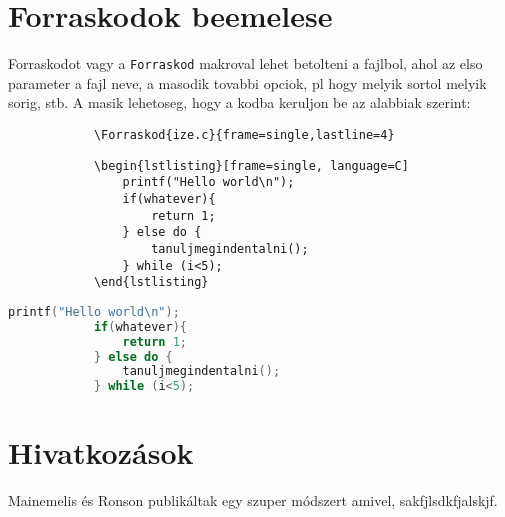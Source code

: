 \documentclass[12ppt,a4paper,oneside]{report}
\begin{document}
    \section{Forraskodok beemelese}
        Forraskodot vagy a \texttt{Forraskod} makroval lehet betolteni a fajlbol, ahol az elso parameter a fajl neve, a masodik tovabbi opciok, pl hogy melyik sortol melyik sorig, stb. A masik lehetoseg, hogy a kodba keruljon be az alabbiak szerint:

        \begin{verbatim}
            \Forraskod{ize.c}{frame=single,lastline=4}
        \end{verbatim}


        \begin{verbatim}
            \begin{lstlisting}[frame=single, language=C]
                printf("Hello world\n");
                if(whatever){
                    return 1;
                } else do {
                    tanuljmegindentalni();
                } while (i<5);
            \end{lstlisting}
        \end{verbatim}
        
        \begin{lstlisting}[frame=single, language=C]
            printf("Hello world\n");
            if(whatever){
                return 1;
            } else do {
                tanuljmegindentalni();
            } while (i<5);
        \end{lstlisting}

    \section{Hivatkozások}

    Mainemelis és Ronson publikáltak egy szuper módszert amivel, sakfjlsdkfjalskjf\cite{MAINEMELIS200681}.


    
\end{document}
